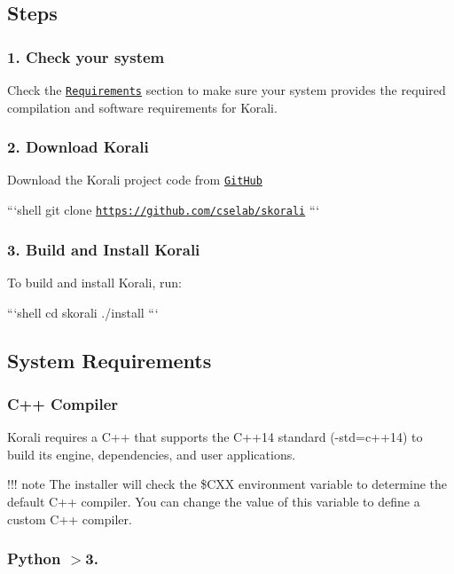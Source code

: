 \subsection*{Steps}

\subsubsection*{1. Check your system}

Check the \href{#system-requirements}{\tt Requirements} section to make sure your system provides the required compilation and software requirements for Korali.

\subsubsection*{2. Download Korali}

Download the Korali project code from \href{https://github.com/cselab/skorali}{\tt Git\-Hub}

```shell git clone \href{https://github.com/cselab/skorali}{\tt https\-://github.\-com/cselab/skorali} ```

\subsubsection*{3. Build and Install Korali}

To build and install Korali, run\-:

```shell cd skorali ./install ```

\subsection*{System Requirements}

\subsubsection*{C++ Compiler}

Korali requires a C++ that supports the C++14 standard ({\ttfamily -\/std=c++14}) to build its engine, dependencies, and user applications.

!!! note The installer will check the \$\-C\-X\-X environment variable to determine the default C++ compiler. You can change the value of this variable to define a custom C++ compiler.

\subsubsection*{Python $>$3.}

